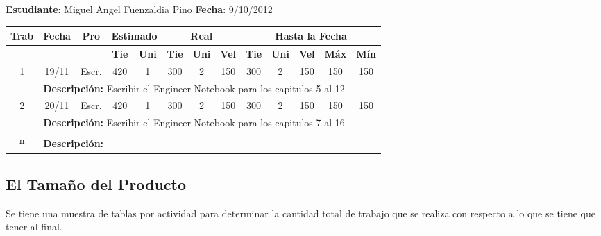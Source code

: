 \documentclass[a4paper,12pt,openany,oneside]{book}
\begin{document}
\textbf{Estudiante}: Miguel Angel Fuenzaldia Pino     \textbf{Fecha}: 9/10/2012\\
\begin{tabular}{|c|c|c|c|c|c|c|c|c|c|c|c|c|}
\hline
\textbf{Trab} & \textbf{Fecha} & \textbf{Pro} & \multicolumn{2}{|c|}{\textbf{Estimado}} & \multicolumn{3}{|c|}{\textbf{Real}} & \multicolumn{5}{|c|}{\textbf{Hasta la Fecha}} \\
\hline
 & & & \textbf{Tie} & \textbf{Uni} & \textbf{Tie} & \textbf{Uni} & \textbf{Vel} & \textbf{Tie} & \textbf{Uni} & \textbf{Vel} & \textbf{Máx} & \textbf{Mín} \\
\hline
\multirow{2}{*}{1} & 19/11 & Escr. & 420 & 1 & 300 & 2 & 150 & 300 & 2 & 150 & 150 & 150 \\
\cline{2-13} & \multicolumn{12}{|l|}{\textbf{Descripción:} Escribir el Engineer Notebook para los capitulos 5 al 12}\\
\hline
\multirow{2}{*}{2} & 20/11 & Escr. & 420 & 1 & 300 & 2 & 150 & 300 & 2 & 150 & 150 & 150 \\
\cline{2-13} & \multicolumn{12}{|l|}{\textbf{Descripción:} Escribir el Engineer Notebook para los capitulos 7 al 16}\\
\hline
\multirow{2}{*}{n} & & & & & & & & & & & & \\
\cline{2-13} & \multicolumn{12}{|l|}{\textbf{Descripción:}}\\
\hline
\end{tabular}
\subsection{El Tamaño del Producto}
Se tiene una muestra de tablas por actividad para determinar la cantidad total de trabajo que se realiza con respecto a lo que se tiene que tener al final.
\end{document}
